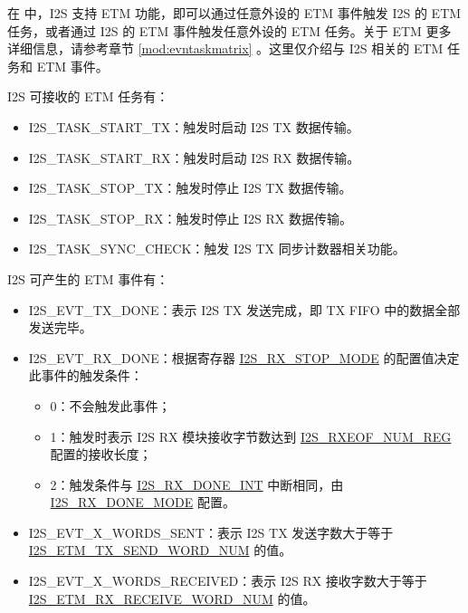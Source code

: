 \documentclass[main\_\_CN.tex]{subfiles}
\begin{document}
在 \chipname{} 中，I2S 支持 ETM 功能，即可以通过任意外设的 ETM 事件触发 I2S 的 ETM 任务，或者通过 I2S 的 ETM 事件触发任意外设的 ETM 任务。关于 ETM 更多详细信息，请参考章节 \ref{mod:evntaskmatrix} \textit{}。这里仅介绍与 I2S 相关的 ETM 任务和 ETM 事件。

I2S 可接收的 ETM 任务有：

\begin{itemize}
    \item \label{task:I2STASKSTARTTX}I2S\_TASK\_START\_TX：触发时启动 I2S TX 数据传输。
    \item \label{task:I2STASKSTARTRX}I2S\_TASK\_START\_RX：触发时启动 I2S RX 数据传输。
    \item \label{task:I2STASKSTOPTX}I2S\_TASK\_STOP\_TX：触发时停止 I2S TX 数据传输。
    \item \label{task:I2STASKSTOPRX}I2S\_TASK\_STOP\_RX：触发时停止 I2S RX 数据传输。
    \item \label{task:I2STASKSYNCCHECK}I2S\_TASK\_SYNC\_CHECK：触发 I2S TX 同步计数器相关功能。
\end{itemize}

I2S 可产生的 ETM 事件有：

\begin{itemize}
    \item \label{evt:I2SEVTTXDONE}I2S\_EVT\_TX\_DONE：表示 I2S TX 发送完成，即 TX FIFO 中的数据全部发送完毕。
    \item \label{evt:I2SEVTRXDONE}I2S\_EVT\_RX\_DONE：根据寄存器 \hyperref[fielddesc:I2SRXSTOPMODE]{I2S\_RX\_STOP\_MODE} 的配置值决定此事件的触发条件：
    \begin{itemize}
        \item 0：不会触发此事件；
        \item 1：触发时表示 I2S RX 模块接收字节数达到 \hyperref[regdesc:I2SRXEOFNUMREG]{I2S\_RXEOF\_NUM\_REG} 配置的接收长度；
        \item 2：触发条件与 \hyperref[int:I2SRXDONEINT]{I2S\_RX\_DONE\_INT} 中断相同，由 \hyperref[fielddesc:I2SRXDONEMODE]{I2S\_RX\_DONE\_MODE} 配置。
    \end{itemize}
    \item \label{evt:I2SEVTXWORDSSENT}I2S\_EVT\_X\_WORDS\_SENT：表示 I2S TX 发送字数大于等于 \hyperref[fielddesc:I2SETMTXSENDWORDNUM]{I2S\_ETM\_TX\_SEND\_WORD\_NUM} 的值。
    \item \label{evt:I2SEVTXWORDSRECEIVED}I2S\_EVT\_X\_WORDS\_RECEIVED：表示 I2S RX 接收字数大于等于 \hyperref[fielddesc:I2SETMRXRECEIVEWORDNUM]{I2S\_ETM\_RX\_RECEIVE\_WORD\_NUM} 的值。
\end{itemize}
\end{document}
